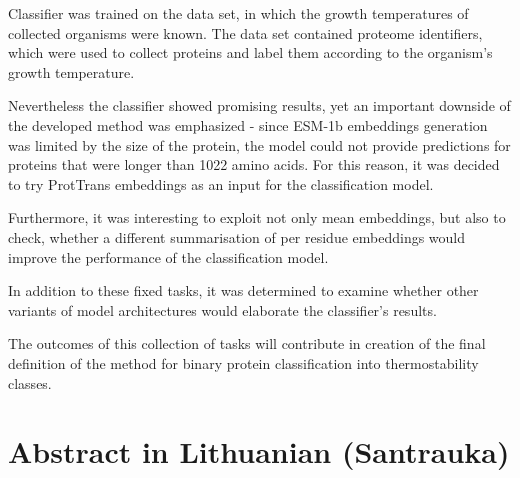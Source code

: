 \documentclass[12pt]{article}
\begin{document}
    Classifier was trained on the data set, in which the 
    growth temperatures of collected organisms were known. The 
    data set contained proteome identifiers, which were used 
    to collect proteins and label them according to the 
    organism's growth temperature. 

    Nevertheless the classifier showed promising results, yet an
    important downside of the developed method was emphasized -
    since ESM-1b embeddings generation was limited by the size 
    of the protein, the model could not provide predictions for 
    proteins that were longer than 1022 amino acids. For this 
    reason, it was decided to try ProtTrans embeddings as an 
    input for the classification model.

    Furthermore, it was interesting to exploit not only mean 
    embeddings, but also to check, whether a different 
    summarisation of per residue embeddings would improve the 
    performance of the classification model.

    In addition to these fixed tasks, it was determined to 
    examine whether other variants of model architectures 
    would elaborate the classifier's results.

    The outcomes of this collection of tasks will 
    contribute in creation of the final definition of the method
    for binary protein classification into thermostability 
    classes.

	\normalsize

	\newpage

	\section{Abstract in Lithuanian (Santrauka)}
\end{document}

